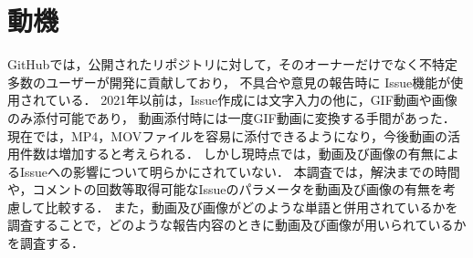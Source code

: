 \section{動機\label{motivation}}

GitHubでは，公開されたリポジトリに対して，そのオーナーだけでなく不特定多数のユーザーが開発に貢献しており，
不具合や意見の報告時に Issue機能が使用されている．
2021年以前は，Issue作成には文字入力の他に，GIF動画や画像のみ添付可能であり，
動画添付時には一度GIF動画に変換する手間があった．
現在では，MP4，MOVファイルを容易に添付できるようになり，今後動画の活用件数は増加すると考えられる．
しかし現時点では，動画及び画像の有無によるIssueへの影響について明らかにされていない．
本調査では，解決までの時間や，コメントの回数等取得可能なIssueのパラメータを動画及び画像の有無を考慮して比較する．
また，動画及び画像がどのような単語と併用されているかを調査することで，どのような報告内容のときに動画及び画像が用いられているかを調査する．